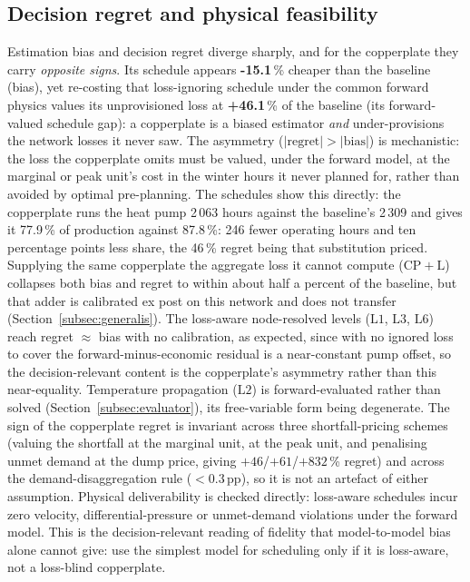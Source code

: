 \documentclass[a4paper,fleqn]{cas-sc}
\DeclareRobustCommand{\CPL}{\ensuremath{\mathrm{CP{+}L}}}
\DeclareRobustCommand{\Lone}{\ensuremath{\mathrm{L1}}}
\DeclareRobustCommand{\Ltwo}{\ensuremath{\mathrm{L2}}}
\DeclareRobustCommand{\Lthree}{\ensuremath{\mathrm{L3}}}
\DeclareRobustCommand{\Lsix}{\ensuremath{\mathrm{L6}}}
\begin{document}
\subsection{Decision regret and physical feasibility}
Estimation bias and decision regret diverge sharply, and for the copperplate they
carry \emph{opposite signs}. Its schedule appears \textbf{-15.1}\,\% cheaper
than the baseline (bias), yet re-costing that loss-ignoring schedule under the common
forward physics values its unprovisioned loss at \textbf{+46.1}\,\% of the baseline
(its forward-valued schedule gap): a copperplate is a biased estimator \emph{and}
under-provisions the network losses it never saw. The asymmetry
($|\text{regret}|>|\text{bias}|$) is mechanistic: the loss the copperplate omits must
be valued, under the forward model, at the marginal or peak unit's cost in the winter
hours it never planned for, rather than avoided by optimal pre-planning. The schedules show this directly: the copperplate runs the heat pump 2\,063 hours against the baseline's 2\,309 and gives it 77.9\,\% of production against 87.8\,\%: 246 fewer operating hours and ten percentage points less share, the 46\,\% regret being that substitution priced. Supplying the same
copperplate the aggregate loss it cannot compute (\CPL) collapses both bias and regret
to within about half a percent of the baseline, but that adder is calibrated ex post on this
network and does not transfer (Section~\ref{subsec:generalis}). The loss-aware node-resolved levels
(\Lone, \Lthree, \Lsix) reach regret $\approx$ bias with no calibration, as expected, since with
no ignored loss to cover the forward-minus-economic residual is a near-constant pump offset, so
the decision-relevant content is the copperplate's asymmetry rather than this near-equality.
Temperature propagation (\Ltwo) is forward-evaluated rather than solved (Section~\ref{subsec:evaluator}), its
free-variable form being degenerate. The sign of the
copperplate regret is invariant across three shortfall-pricing schemes (valuing the shortfall at
the marginal unit, at the peak unit, and penalising unmet demand at the dump price, giving
$+46$/$+61$/$+832$\,\% regret) and across the demand-disaggregation rule
($<0.3$\,pp), so it is not an artefact of either assumption. Physical deliverability is
checked directly: loss-aware schedules incur zero velocity, differential-pressure or
unmet-demand violations under the forward model. This is the decision-relevant reading of
fidelity that model-to-model bias alone cannot give: use the simplest model for
scheduling only if it is loss-aware, not a loss-blind copperplate.
\end{document}
